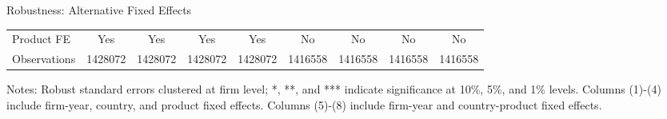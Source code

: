 \documentclass[10pt]{beamer}
\begin{document}
\begin{frame}{Robustness: Alternative Fixed Effects}
\begin{table}[htbp]
{\begin{threeparttable}
\begin{tabular}{lcccccccc}
			Product FE &  Yes   & Yes   & Yes   & Yes & No & No & No & No\\
			Observations & 1428072 & 1428072 & 1428072 & 1428072 & 1416558 & 1416558 & 1416558 & 1416558 \\
			\bottomrule
		\end{tabular}
		\begin{tablenotes}
			\footnotesize
			\item Notes: Robust standard errors clustered at firm level; *, **, and *** indicate significance at 10\%, 5\%, and 1\% levels. Columns (1)-(4) include firm-year, country, and product fixed effects.  Columns (5)-(8) include firm-year and country-product fixed effects.
		\end{tablenotes}
	\end{threeparttable}
        }
	\label{tab.robust.fe}
    \end{table}
    \hyperlink{robustness_other}{}
\end{frame}
\end{document}
